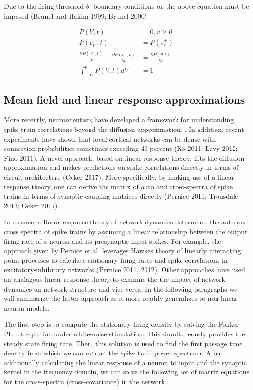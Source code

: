 \documentclass{ucetd}
\begin{document}
Due to the firing threshold $\theta$, boundary conditions on the above equation must be imposed (Brunel and Hakim 1999; Brunel 2000)

\begin{align*}
P(V,t) &= 0, v\geq \theta\\
P(v_{r}^{-},t) &= P(v_{r}^{+})\\
\frac{\partial P(v_{r}^{+},t)}{\partial t}-\frac{\partial P(v_{r}^{-},t)}{\partial t} &= \frac{\partial P(\theta,t)}{\partial t}\\
\int_{-\infty}^{\theta} P(V,t)dV &= 1
\end{align*}


\subsection{Mean field and linear response approximations}

More recently, neuroscientists have developed a framework for understanding spike train correlations beyond the diffusion approximation. . In addition, recent experiments have shown that local cortical networks can be dense with connection probabilities sometimes exceeding 40 percent (Ko 2011; Levy 2012; Fino 2011). A novel approach, based on linear response theory, lifts the diffusion approximation and makes predictions on spike correlations directly in terms of circuit architecture (Ocker 2017). More specifically, by making use of a linear response theory, one can derive the matrix of auto and cross-spectra of spike trains in terms of synaptic coupling matrices directly (Pernice 2011; Trousdale 2013; Ocker 2017).

In essence, a linear response theory of network dynamics determines the auto and cross spectra of spike trains by assuming a linear relationship between the output firing rate of a neuron and its presynaptic input spikes. For example, the approach given by Pernice et al. leverages Hawkes theory of linearly interacting point processes to calculate stationary firing rates and spike correlations in excitatory-inhibitory networks (Pernice 2011, 2012). Other approaches have used an analagous linear response theory to examine the the impact of network dynamics on network structure and vice-versa. In the following paragraphs we will summarize the latter approach as it more readily generalizes to non-linear neuron models.

The first step is to compute the stationary firing density by solving the Fokker-Planck equation under white-noise stimulation. This simultaneously provides the steady state firing rate. Then, this solution is used to find the first passage time density from which we can extract the spike train power spectrum. After additionally calculating the linear response of a neuron to input and the synaptic kernel in the frequency domain, we can solve the following set of matrix equations for the cross-spectra (cross-covariance) in the network
\end{document}
